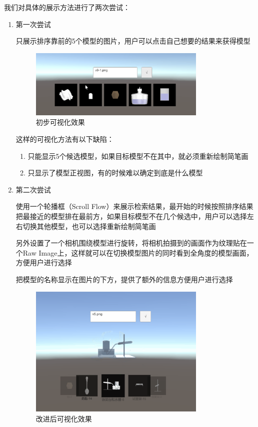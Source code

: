 \documentclass{article}
\begin{document}
我们对具体的展示方法进行了两次尝试：
\begin{enumerate}
    \item 第一次尝试
    
    \qquad 只展示排序靠前的5个模型的图片，用户可以点击自己想要的结果来获得模型
    
    \begin{figure}[htb]
        \centering
        \includegraphics[width=0.8\textwidth]{images/version1.png}
        \caption{初步可视化效果}\label{fig:digit}
    \end{figure} 
    
    \qquad 这样的可视化方法有以下缺陷：
    \begin{enumerate}
        \item 只能显示5个候选模型，如果目标模型不在其中，就必须重新绘制简笔画
        \item 只显示了模型正视图，有的时候难以确定到底是什么模型
    \end{enumerate}
    
    \item 第二次尝试
    
    \qquad 使用一个轮播框（Scroll Flow）来展示检索结果，最开始的时候按照排序结果把最接近的模型排在最前方，如果目标模型不在几个候选中，用户可以选择左右切换其他模型，也可以选择重新绘制简笔画
    
    \qquad 另外设置了一个相机围绕模型进行旋转，将相机拍摄到的画面作为纹理贴在一个Raw Image上，这样就可以在切换模型图片的同时看到全角度的模型画面，方便用户进行选择
    
    \qquad 把模型的名称显示在图片的下方，提供了额外的信息方便用户进行选择
    
    \begin{figure}[htb]
        \centering
        \includegraphics[width=0.8\textwidth]{images/version2.png}
        \caption{改进后可视化效果}\label{fig:digit}
    \end{figure} 
    
\end{enumerate}
\end{document}
